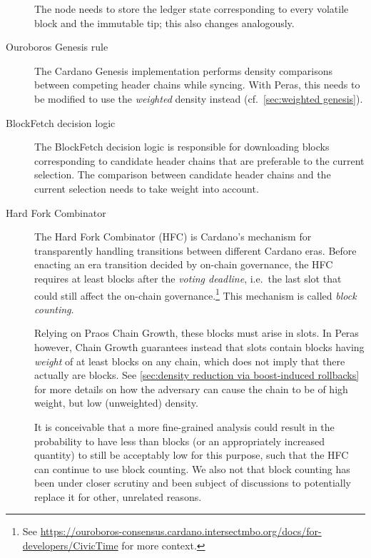 \begin{description}
  The node needs to store the ledger state corresponding to every volatile block and the immutable tip; this also changes analogously.
\item[Ouroboros Genesis rule]
  The Cardano Genesis implementation \parencite{genesis-implementation-documentation} performs density comparisons between competing header chains while syncing.
  With Peras, this needs to be modified to use the \emph{weighted} density instead (cf.~\cref{sec:weighted genesis}).
\item[BlockFetch decision logic]
  The BlockFetch decision logic is responsible for downloading blocks corresponding to candidate header chains that are preferable to the current selection.
  The comparison between candidate header chains and the current selection needs to take weight into account.
\item[Hard Fork Combinator]
  The Hard Fork Combinator (HFC) is Cardano's mechanism for transparently handling transitions between different Cardano eras.
  Before enacting an era transition decided by on-chain governance, the HFC requires at least \kcp{} blocks after the \emph{voting deadline}, i.e.\ the last slot that could still affect the on-chain governance.\footnote{
    See \url{https://ouroboros-consensus.cardano.intersectmbo.org/docs/for-developers/CivicTime} for more context.}
  This mechanism is called \emph{block counting}.

  Relying on Praos Chain Growth, these \kcp{} blocks must arise in \Tcp{} slots.
  In Peras however, Chain Growth guarantees instead that \Tcp{} slots contain blocks having \emph{weight} of at least \kcp{} blocks on any chain, which does not imply that there actually are \kcp{} blocks.
  See \cref{sec:density reduction via boost-induced rollbacks} for more details on how the adversary can cause the chain to be of high weight, but low (unweighted) density.

  It is conceivable that a more fine-grained analysis could result in the probability to have less than \kcp{} blocks (or an appropriately increased quantity) to still be acceptably low for this purpose, such that the HFC can continue to use block counting.
  We also not that block counting has been under closer scrutiny and been subject of discussions to potentially replace it for other, unrelated reasons.
\end{description}


